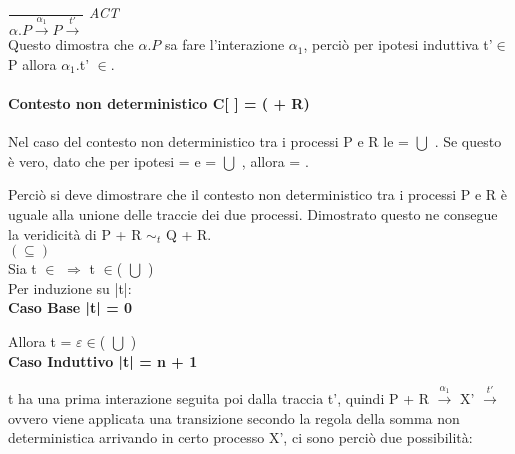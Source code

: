 $\dfrac{}{\alpha.P \overset{\alpha_{1}}\rightarrow P\overset{t'}\rightarrow}$ \textit{ACT} \\

Questo dimostra che $\alpha.P$ sa fare l'interazione $\alpha_{1}$, perciò per ipotesi induttiva t'$\in$P allora $\alpha_{1}$.t' $\in$.
\\

\paragraph{Contesto non deterministico  C[ ] = (\hspace{0.3cm} + R)} \mbox{}

Nel caso del contesto non deterministico tra i processi P e R le  =  $\bigcup$ . Se questo è vero, dato che per ipotesi  =  e  =  $\bigcup$ , allora  =  .

Perciò si deve dimostrare che il contesto non deterministico tra i processi P e R è uguale alla unione delle traccie dei due processi. Dimostrato questo ne consegue la veridicità di P + R $\sim_{t}$ Q + R.\\

$(\subseteq)$ \\

Sia t $\in$  $\Rightarrow$  t $\in$( $\bigcup$ )\\
Per induzione su |t|:
\\

\textbf{Caso Base |t| = 0}

Allora t = $\varepsilon \in$( $\bigcup$ )
\\

\textbf{Caso Induttivo |t| = n + 1}

t ha una prima interazione seguita poi dalla traccia t', quindi P + R $ \overset{\alpha_{1}}\rightarrow $ X' $\overset{t'}\rightarrow$ ovvero viene applicata una transizione secondo la regola della somma non deterministica arrivando in certo processo X', ci sono perciò due possibilità:

